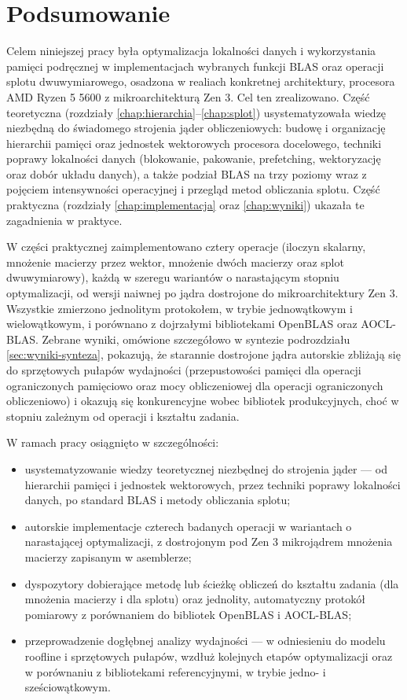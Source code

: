 \documentclass[a4paper,12pt]{book} %
\renewcommand{\chaptermark}[1]{\markboth{#1}{}}
\begin{document}
\chapter*{Podsumowanie} %
\chaptermark{Podsumowanie}

Celem niniejszej pracy była optymalizacja lokalności danych i wykorzystania pamięci podręcznej w implementacjach wybranych funkcji BLAS oraz operacji splotu dwuwymiarowego, osadzona w realiach konkretnej architektury, procesora AMD Ryzen 5 5600 z mikroarchitekturą Zen 3. Cel ten zrealizowano. Część teoretyczna (rozdziały \ref{chap:hierarchia}--\ref{chap:splot}) usystematyzowała wiedzę niezbędną do świadomego strojenia jąder obliczeniowych: budowę i organizację hierarchii pamięci oraz jednostek wektorowych procesora docelowego, techniki poprawy lokalności danych (blokowanie, pakowanie, prefetching, wektoryzację oraz dobór układu danych), a także podział BLAS na trzy poziomy wraz z pojęciem intensywności operacyjnej i przegląd metod obliczania splotu. Część praktyczna (rozdziały \ref{chap:implementacja} oraz \ref{chap:wyniki}) ukazała te zagadnienia w praktyce.

W części praktycznej zaimplementowano cztery operacje (iloczyn skalarny, mnożenie macierzy przez wektor, mnożenie dwóch macierzy oraz splot dwuwymiarowy), każdą w szeregu wariantów o narastającym stopniu optymalizacji, od wersji naiwnej po jądra dostrojone do mikroarchitektury Zen 3. Wszystkie zmierzono jednolitym protokołem, w trybie jednowątkowym i wielowątkowym, i porównano z dojrzałymi bibliotekami OpenBLAS oraz AOCL-BLAS. Zebrane wyniki, omówione szczegółowo w syntezie podrozdziału \ref{sec:wyniki-synteza}, pokazują, że starannie dostrojone jądra autorskie zbliżają się do sprzętowych pułapów wydajności (przepustowości pamięci dla operacji ograniczonych pamięciowo oraz mocy obliczeniowej dla operacji ograniczonych obliczeniowo) i okazują się konkurencyjne wobec bibliotek produkcyjnych, choć w stopniu zależnym od operacji i kształtu zadania.

W ramach pracy osiągnięto w szczególności:
\begin{itemize}
  \item usystematyzowanie wiedzy teoretycznej niezbędnej do strojenia jąder --- od hierarchii pamięci i jednostek wektorowych, przez techniki poprawy lokalności danych, po standard BLAS i metody obliczania splotu;
  \item autorskie implementacje czterech badanych operacji w wariantach o narastającej optymalizacji, z dostrojonym pod Zen 3 mikrojądrem mnożenia macierzy zapisanym w asemblerze;
  \item dyspozytory dobierające metodę lub ścieżkę obliczeń do kształtu zadania (dla mnożenia macierzy i dla splotu) oraz jednolity, automatyczny protokół pomiarowy z porównaniem do bibliotek OpenBLAS i AOCL-BLAS;
  \item przeprowadzenie dogłębnej analizy wydajności --- w odniesieniu do modelu roofline i sprzętowych pułapów, wzdłuż kolejnych etapów optymalizacji oraz w porównaniu z bibliotekami referencyjnymi, w trybie jedno- i sześciowątkowym.
\end{itemize}
\end{document}
